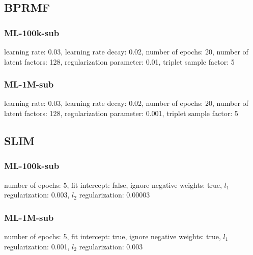 \subsection{BPRMF}
\subsubsection{ML-100k-sub}
learning rate: 0.03, learning rate decay: 0.02, number of epochs: 20, number of latent factors: 128, regularization parameter: 0.01, triplet sample factor: 5

\subsubsection{ML-1M-sub}
learning rate: 0.03, learning rate decay: 0.02, number of epochs: 20, number of latent factors: 128, regularization parameter: 0.001, triplet sample factor: 5

\subsection{SLIM}
\subsubsection{ML-100k-sub}
number of epochs: 5, fit intercept: false, ignore negative weights: true, $l_1$ regularization: 0.003, $l_2$ regularization: 0.00003

\subsubsection{ML-1M-sub}
number of epochs: 5, fit intercept: true, ignore negative weights: true, $l_1$ regularization: 0.001, $l_2$ regularization: 0.003